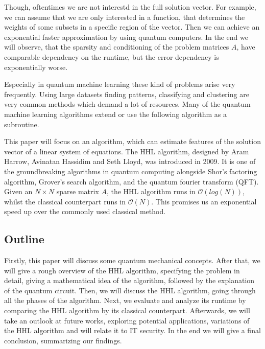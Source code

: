 Though, oftentimes we are not interestd in the full solution vector. 
For example, we can assume that we are only interested in a function, that determines the weights of some subsets in a specific region of the vector.
Then we can achieve an exponential faster approximation by using quantum computers. 
In the end we will observe, that the sparsity and conditioning of the problem matrices $A$, have comparable dependency on the runtime, but the error dependency is exponentially worse. 

Especially in quantum machine learning these kind of problems arise very frequently. 
Using large datasets finding patterns, classifying and clustering are very common methods which demand a lot of resources. 
Many of the quantum machine learning algorithms extend or use the following algorithm as a subroutine. 

This paper will focus on an algorithm, which can estimate features of the solution vector of a linear system of equations.
The HHL algorithm, designed by Aram Harrow, Avinatan Hassidim and Seth Lloyd, was introduced in 2009. 
It is one of the groundbreaking algorithms in quantum computing alongside Shor's factoring algorithm, Grover's search algorithm, and the quantum fourier transform (QFT).
Given an $N \times N$ sparse matrix $A$, the HHL algorithm runs in $\mathcal{O} (log (N))$, whilst the classical counterpart runs in $\mathcal{O} (N)$.
This promises us an exponential speed up over the commonly used classical method.

\subsection{Outline}
Firstly, this paper will discuss some quantum mechanical concepts.
After that, we will give a rough overview of the HHL algorithm, specifying the problem in detail, giving a mathematical idea of the algorithm, followed by the explanation of the quantum circuit.
Then, we will discuss the HHL algorithm, going through all the phases of the algorithm.
Next, we evaluate and analyze its runtime by comparing the HHL algorithm by its classical counterpart. 
Afterwards, we will take an outlook at future works, exploring potential applications, variations of the HHL algorithm and will relate it to IT security. 
In the end we will give a final conclusion, summarizing our findings. 




